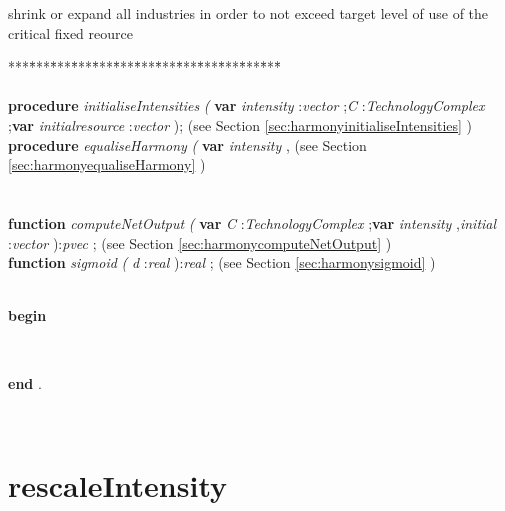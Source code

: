 shrink or expand all industries in order to not exceed target level of use of the critical fixed reource
\begin{tabbing}
***\=***\=***\=***\=***\=***\=***\=***\=***\=***\=***\=***\=***\=\kill
\+ \+ \\
\\
\<\textsf{\textbf{procedure}  \textit{initialiseIntensities} \textit{(} \textbf{var}  \textit{intensity} :\textit{vector} ;\textit{C} :\textit{TechnologyComplex}  ;\textbf{var}  \textit{initialresource}  :\textit{vector} );} (see Section \ref{sec:harmonyinitialiseIntensities} )\\
\<\textsf{\textbf{procedure}   \textit{equaliseHarmony} \textit{(}  \textbf{var}  \textit{intensity} ,} (see Section \ref{sec:harmonyequaliseHarmony} )\\
\\
\\
\<\textsf{\textbf{function}  \textit{computeNetOutput} \textit{(} \textbf{var}  \textit{C} :\textit{TechnologyComplex}  ;\textbf{var}  \textit{intensity} ,\textit{initial} :\textit{vector} ):\textit{pvec} ;} (see Section \ref{sec:harmonycomputeNetOutput} )\\
\<\textsf{\textbf{function}  \textit{sigmoid} \textit{(}   \textit{d} :\textit{real} ):\textit{real} ;} (see Section \ref{sec:harmonysigmoid} )\\
\\
\-\<\+\parbox{14cm}{\textsf{\textbf{begin} }}\\
\<\-\parbox{14cm}{\textsf{\textbf{end} .}}\\
\end{tabbing}
\section{rescaleIntensity}\label{sec:harmonyrescaleIntensity}

